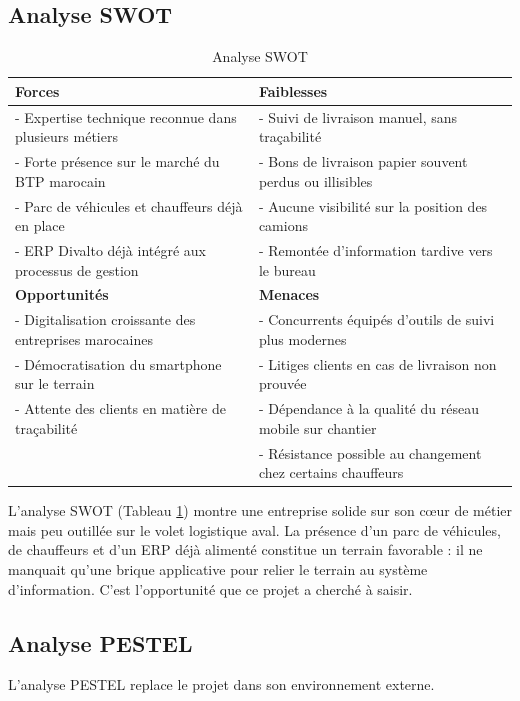 \documentclass[12pt,a4paper]{report}
\begin{document}
\subsection{Analyse SWOT}

\begin{table}[htbp]
\centering
\caption{Analyse SWOT}
\label{tab:swot_complete}
\begin{tabular}{|p{7cm}|p{7cm}|}
\hline
\textbf{Forces} & \textbf{Faiblesses} \\
\hline
- Expertise technique reconnue dans plusieurs métiers & - Suivi de livraison manuel, sans traçabilité \\
- Forte présence sur le marché du BTP marocain & - Bons de livraison papier souvent perdus ou illisibles \\
- Parc de véhicules et chauffeurs déjà en place & - Aucune visibilité sur la position des camions \\
- ERP Divalto déjà intégré aux processus de gestion & - Remontée d'information tardive vers le bureau \\
\hline
\textbf{Opportunités} & \textbf{Menaces} \\
\hline
- Digitalisation croissante des entreprises marocaines & - Concurrents équipés d'outils de suivi plus modernes \\
- Démocratisation du smartphone sur le terrain & - Litiges clients en cas de livraison non prouvée \\
- Attente des clients en matière de traçabilité & - Dépendance à la qualité du réseau mobile sur chantier \\
 & - Résistance possible au changement chez certains chauffeurs \\
\hline
\end{tabular}
\end{table}

L'analyse SWOT (Tableau \ref{tab:swot_complete}) montre une entreprise solide sur son cœur de métier mais peu outillée sur le volet logistique aval. La présence d'un parc de véhicules, de chauffeurs et d'un ERP déjà alimenté constitue un terrain favorable : il ne manquait qu'une brique applicative pour relier le terrain au système d'information. C'est l'opportunité que ce projet a cherché à saisir.

\subsection{Analyse PESTEL}

L'analyse PESTEL replace le projet dans son environnement externe.
\end{document}
